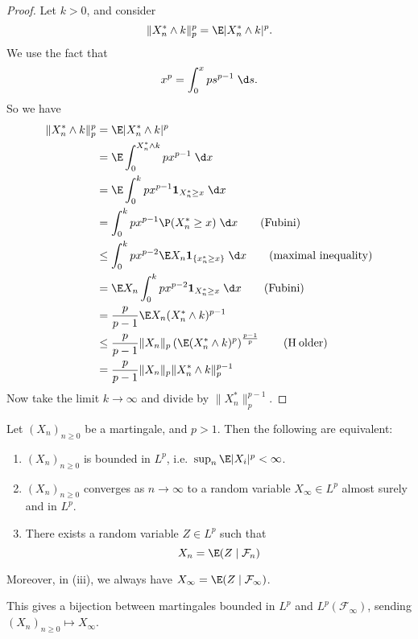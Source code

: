 \documentclass[a4paper]{article}
\begin{document}
\begin{proof}
  Let $k > 0$, and consider
  \[
    \|X_n^* \wedge k \|^p_p = \E |X_n^* \wedge k|^p.
  \]
  We use the fact that
  \[
    x^p = \int_0^x p s^{p - 1}\;\d s.
  \]
  So we have
  \begin{align*}
    \|X_n^* \wedge k\|^p_p &= \E|X_n^* \wedge k|^p\\
    &= \E \int_0^{X_n^* \wedge k} p x^{p - 1}\;\d x\\
    &= \E \int_0^k p x^{p - 1} \mathbf{1}_{X_n^* \geq x}\;\d x\\
    &= \int_0^k p x^{p - 1} \P(X_n^* \geq x)\;\d x\tag{Fubini}\\
    &\leq \int_0^k px^{p - 2} \E X_n \mathbf{1}_{\{x_n^* \geq x\}} \;\d x\tag{maximal inequality}\\
    &= \E X_n \int_0^k p x^{p - 2} \mathbf{1}_{X_n^* \geq x}\;\d x \tag{Fubini}\\
    &= \frac{p}{p - 1} \E X_n (X_n^* \wedge k) ^{p - 1}\\
    &\leq \frac{p}{p - 1} \|X_n\|_p \left(\E(X_n^* \wedge k)^p\right)^{\frac{p - 1}{p}}\tag{H\:older}\\
    &= \frac{p}{p - 1} \|X_n\|_p \|X_n^* \wedge k\|_p^{p - 1}
  \end{align*}
  Now take the limit $k \to \infty$ and divide by $\|X_n^*\|_p^{p - 1}$.
\end{proof}

\begin{thm}
  Let $(X_n)_{n \geq 0}$ be a martingale, and $p > 1$. Then the following are equivalent:
  \begin{enumerate}
    \item $(X_n)_{n \geq 0}$ is bounded in $L^p$, i.e.\ $\sup_n \E |X_i|^p < \infty$.
    \item $(X_n)_{n \geq 0}$ converges as $n \to \infty$ to a random variable $X_\infty \in L^p$ almost surely and in $L^p$.
    \item There exists a random variable $Z \in L^p$ such that
      \[
        X_n = \E (Z \mid \mathcal{F}_n)
      \]
  \end{enumerate}
  Moreover, in (iii), we always have $X_\infty = \E(Z \mid \mathcal{F}_\infty)$.
\end{thm}
This gives a bijection between martingales bounded in $L^p$ and $L^p(\mathcal{F}_\infty)$, sending $(X_n)_{n \geq 0} \mapsto X_\infty$.
\end{document}
